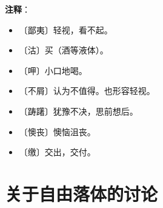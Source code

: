 \documentclass[12pt,UTF-8,openany]{ctexbook}
\begin{document}
\newpage

\textbf{注释}：

\vspace{-1em}

\begin{itemize}
    \setlength\itemsep{-0.2em}
    \item 〔鄙夷〕轻视，看不起。
    \item 〔沽〕买（酒等液体）。
    \item 〔呷〕小口地喝。
    \item 〔不屑〕认为不值得。也形容轻视。
    \item 〔踌躇〕犹豫不决，思前想后。
    \item 〔懊丧〕懊恼沮丧。
    \item 〔缴〕交出，交付。
\end{itemize}

\chapter{关于自由落体的讨论}
\end{document}
